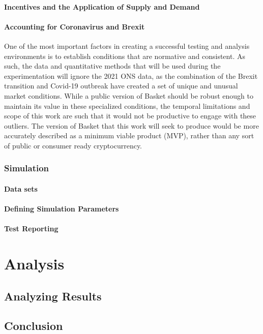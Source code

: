 \documentclass[bsc,frontabs,singlespacing,parskip,deptreport]{infthesis}
\begin{document}
    \subsubsection{Incentives and the Application of Supply and Demand}
    \subsubsection{Accounting for Coronavirus and Brexit}
    One of the most important factors in creating a successful testing and analysis environments is to establish conditions that are normative and consistent. As such, the data and quantitative methods that will be used during the experimentation will ignore the 2021 ONS data, as the combination of the Brexit transition and Covid-19 outbreak have created a set of unique and unusual market conditions. While a public version of Basket should be robust enough to maintain its value in these specialized conditions, the temporal limitations and scope of this work are such that it would not be productive to engage with these outliers. The version of Basket that this work will seek to produce would be more accurately described as a minimum viable product (MVP), rather than any sort of public or consumer ready cryptocurrency.  
    \subsection{Simulation}
    \subsubsection{Data sets}
    \subsubsection{Defining Simulation Parameters}
    \subsubsection{Test Reporting}



\chapter{Analysis}
\section{Analyzing Results}
\section{Conclusion}
\end{document}
